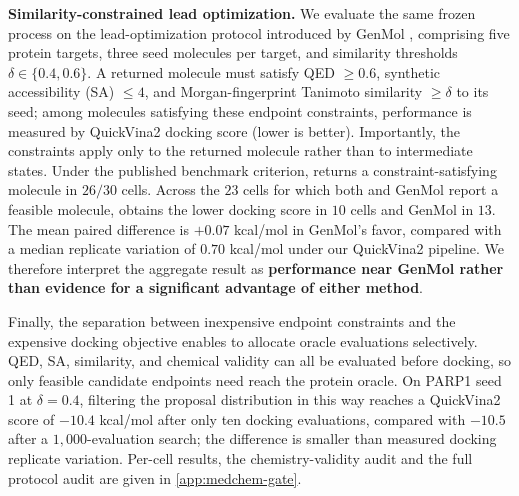 \textbf{Similarity-constrained lead optimization.} We evaluate the same frozen process on the lead-optimization protocol introduced by GenMol \citep{lee2025genmol}, comprising five protein targets, three seed molecules per target, and similarity thresholds $\delta\in\{0.4,0.6\}$. A returned molecule must satisfy QED $\geq0.6$, synthetic accessibility (SA) $\leq4$, and Morgan-fingerprint Tanimoto similarity $\geq\delta$ to its seed; among molecules satisfying these endpoint constraints, performance is measured by QuickVina2 docking score (lower is better). Importantly, the constraints apply only to the returned molecule rather than to intermediate states. Under the published benchmark criterion, \method{} returns a constraint-satisfying molecule in $26/30$ cells. Across the $23$ cells for which both \method{} and GenMol report a feasible molecule, \method{} obtains the lower docking score in $10$ cells and GenMol in $13$. The mean paired difference is $+0.07$ kcal/mol in GenMol's favor, compared with a median replicate variation of $0.70$ kcal/mol under our QuickVina2 pipeline. We therefore interpret the aggregate result as \textbf{performance near GenMol rather than evidence for a significant advantage of either method}.

Finally, the separation between inexpensive endpoint constraints and the expensive docking objective enables \method{} to allocate oracle evaluations selectively. QED, SA, similarity, and chemical validity can all be evaluated before docking, so only feasible candidate endpoints need reach the protein oracle. On PARP1 seed 1 at $\delta=0.4$, filtering the proposal distribution in this way reaches a QuickVina2 score of $-10.4$ kcal/mol after only ten docking evaluations, compared with $-10.5$ after a $1{,}000$-evaluation search; the difference is smaller than measured docking replicate variation. Per-cell results, the chemistry-validity audit and the full protocol audit are given in \cref{app:medchem-gate}.

